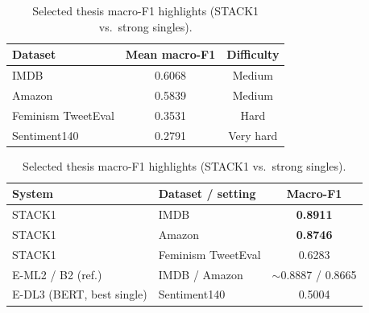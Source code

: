 \begin{table}[t]
  \begin{minipage}[t]{0.48\textwidth}
    \centering
    \caption{Mean macro-F1 by dataset (thesis).}
    \label{tab:by_dataset}
    \begin{tabular*}{\linewidth}{@{\extracolsep{\fill}}lcc@{}}
      \toprule
      Dataset & Mean macro-F1 & Difficulty \\
      \midrule
      IMDB & 0.6068 & Medium \\
      Amazon & 0.5839 & Medium \\
      Feminism TweetEval & 0.3531 & Hard \\
      Sentiment140 & 0.2791 & Very hard \\
      \bottomrule
    \end{tabular*}
  \end{minipage}\hfill
  \begin{minipage}[t]{0.48\textwidth}
    \centering
    \caption{Selected thesis macro-F1 highlights (STACK1 vs.\ strong singles).}
    \label{tab:top_ensemble}
    \begin{tabular*}{\linewidth}{@{\extracolsep{\fill}}llc@{}}
      \toprule
      System & Dataset / setting & Macro-F1 \\
      \midrule
      STACK1 & IMDB & \textbf{0.8911} \\
      STACK1 & Amazon & \textbf{0.8746} \\
      STACK1 & Feminism TweetEval & 0.6283 \\
      E-ML2 / B2 (ref.) & IMDB / Amazon & $\sim$0.8887 / 0.8665 \\
      E-DL3 (BERT, best single) & Sentiment140 & 0.5004 \\
      \bottomrule
    \end{tabular*}
  \end{minipage}
  
  \vspace{1.5em}
  

\end{table}
